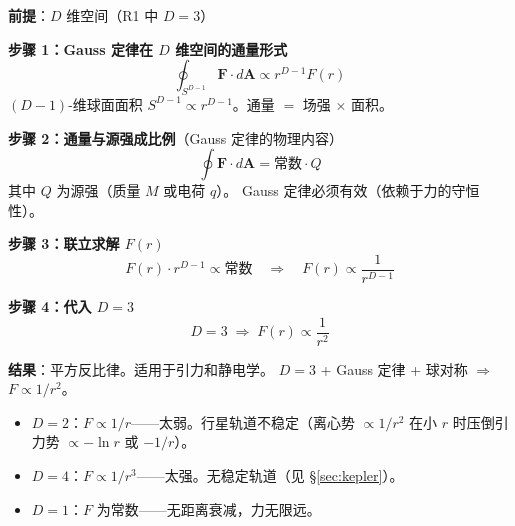 \begin{derivationbox}

\noindent\textbf{前提}：$D$ 维空间（R1 中 $D=3$）

\noindent\textbf{步骤 1：Gauss 定律在 $D$ 维空间的通量形式}
\begin{equation}
\oint_{S^{D-1}} \mathbf{F} \cdot d\mathbf{A} \propto r^{D-1} F(r)
\end{equation}
$(D-1)$-维球面面积 $S^{D-1} \propto r^{D-1}$。通量 $=$ 场强 $\times$ 面积。

\noindent\textbf{步骤 2：通量与源强成比例}{（Gauss 定律的物理内容）}
\begin{equation}
\oint \mathbf{F} \cdot d\mathbf{A} = \text{常数} \cdot Q
\end{equation}
其中 $Q$ 为源强（质量 $M$ 或电荷 $q$）。\fbox{[N]} Gauss 定律必须有效（依赖于力的守恒性）。

\noindent\textbf{步骤 3：联立求解 $F(r)$}
\begin{equation}
F(r) \cdot r^{D-1} \propto \text{常数} \quad\Rightarrow\quad F(r) \propto \frac{1}{r^{D-1}}
\end{equation}

\noindent\textbf{步骤 4：代入 $D=3$}
\begin{equation}
D=3 \;\Rightarrow\; F(r) \propto \frac{1}{r^2}
\end{equation}

\textbf{结果}：平方反比律。适用于引力和静电学。\fbox{[S]} $D=3$ + Gauss 定律 + 球对称 $\Rightarrow$ $F\propto 1/r^2$。



\end{derivationbox}

\begin{limitbox}
  \begin{itemize}
    \item $D=2$：$F \propto 1/r$——太弱。行星轨道不稳定（离心势 $\propto 1/r^2$ 在小 $r$ 时压倒引力势 $\propto -\ln r$ 或 $-1/r$）。
    \item $D=4$：$F \propto 1/r^3$——太强。无稳定轨道（见 \S\ref{sec:kepler}）。
    \item $D=1$：$F$ 为常数——无距离衰减，力无限远。
  \end{itemize}
\end{limitbox}

